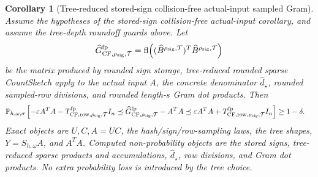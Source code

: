 \documentclass[11pt]{article}
\newcommand{\Prob}{\mathbb{P}}
\newcommand{\fl}{\operatorname{fl}}
\newcommand{\I}{I}
\newcommand{\eps}{\varepsilon}
\newtheorem{corollary}[theorem]{Corollary}
\theoremstyle{remark}
\begin{document}
\begin{corollary}[Tree-reduced stored-sign collision-free actual-input sampled Gram]
Assume the hypotheses of the stored-sign collision-free actual-input
corollary, and assume the tree-depth roundoff guards above.  Let
\[
  \widehat G_{{\rm CF},\rho_{\rm sig},\mathcal T}^{\rm fp}
  =
  \fl\!\left(
    (\widehat B^{\rho_{\rm sig},\mathcal T})^T
    \widehat B^{\rho_{\rm sig},\mathcal T}\right)
\]
be the matrix produced by rounded sign storage, tree-reduced rounded sparse
CountSketch apply to the actual input \(A\), the concrete denominator
\(\widehat d_\star\), rounded sampled-row divisions, and rounded length-\(s\)
Gram dot products.  Then
\[
\begin{aligned}
&\Prob_{h,\omega,\sigma}
  \left[
    -\eps A^TA
    -T_{{\rm CF,row},\rho_{\rm sig},\mathcal T}^{\rm fp}\I_n
    \preceq
    \widehat G_{{\rm CF},\rho_{\rm sig},\mathcal T}^{\rm fp}-A^TA
    \preceq
    \eps A^TA
    +T_{{\rm CF,row},\rho_{\rm sig},\mathcal T}^{\rm fp}\I_n
  \right]
  \ge 1-\delta .
\end{aligned}
\]
Exact objects are \(U,C,A=UC\), the hash/sign/row-sampling laws, the tree
shapes, \(Y=S_{h,\omega}A\), and \(A^TA\).  Computed non-probability objects
are the stored signs, tree-reduced sparse products and accumulations,
\(\widehat d_\star\), row divisions, and Gram dot products.  No extra
probability loss is introduced by the tree choice.


\end{corollary}
\end{document}

